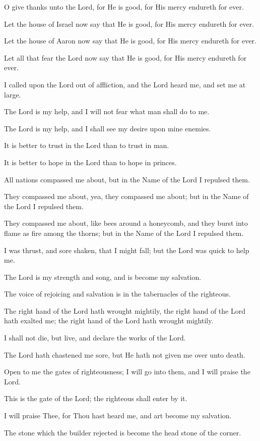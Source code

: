 O give thanks unto the Lord, for He is good, for His mercy endureth for ever.

Let the house of Israel now say that He is good, for His mercy endureth for ever.

Let the house of Aaron now say that He is good, for His mercy endureth for ever.

Let all that fear the Lord now say that He is good, for His mercy endureth for ever.

I called upon the Lord out of affliction, and the Lord heard me, and set me at large.

The Lord is my help, and I will not fear what man shall do to me.

The Lord is my help, and I shall see my desire upon mine enemies.

It is better to trust in the Lord than to trust in man.

It is better to hope in the Lord than to hope in princes.

All nations compassed me about, but in the Name of the Lord I repulsed them.

They compassed me about, yea, they compassed me about; but in the Name of the Lord I repulsed them.

They compassed me about, like bees around a honeycomb, and they burst into flame as fire among the thorns; but in the Name of the Lord I repulsed them.

I was thrust, and sore shaken, that I might fall; but the Lord was quick to help me.

The Lord is my strength and song, and is become my salvation.

The voice of rejoicing and salvation is in the tabernacles of the righteous.

The right hand of the Lord hath wrought mightily, the right hand of the Lord hath exalted me; the right hand of the Lord hath wrought mightily.

I shall not die, but live, and declare the works of the Lord.

The Lord hath chastened me sore, but He hath not given me over unto death.

Open to me the gates of righteousness; I will go into them, and I will praise the Lord.

This is the gate of the Lord; the righteous shall enter by it.

I will praise Thee, for Thou hast heard me, and art become my salvation.

The stone which the builder rejected is become the head stone of the corner.

